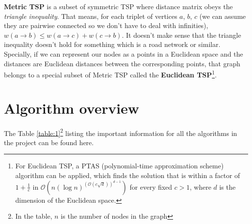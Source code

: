 \documentclass[12pt,twoside,notitlepage]{report}
\begin{document}
{\bf Metric TSP} is a subset of symmetric TSP where distance matrix obeys the {\it triangle inequality}. That means, for each triplet of vertices $a$, $b$, $c$ (we can assume they are pairwise connected so we don't have to deal with infinities), $w(a \rightarrow b) \leq w(a \rightarrow c) + w(c \rightarrow b)$. It doesn't make sense that the triangle inequality doesn't hold for something which is a road network or similar. Specially, if we can represent our nodes as a points in a Euclidean space and the distances are Euclidean distances between the corresponding points, that graph belongs to a special subset of Metric TSP called the {\bf Euclidean TSP}\footnote{For Euclidean TSP, a PTAS\cite{Arora_1998} (polynomial-time approximation scheme) algorithm can be applied, which finds the solution that is within a factor of $1 + \frac{1}{c}$  in $\mathcal{O}(n(\log n)^{(\mathcal{O}(c \sqrt{d}))^{d - 1}})$ for every fixed $c > 1$, where $d$ is the dimension of the Euclidean space.}. %

\section{Algorithm overview}

The Table \ref{table:1}\footnote{In the table, $n$ is the number of nodes in the graph} listing the important information for all the algorithms in the project can be found here.
\end{document}
